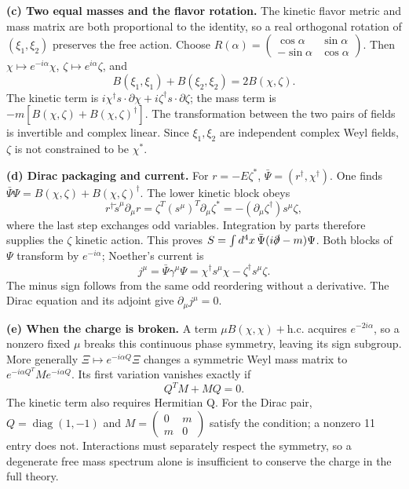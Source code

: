 \documentclass[11pt]{article}
\newcommand{\diag}{\operatorname{diag}}
\newcommand{\hc}{\mathrm{h.c.}}
\newcommand{\partsol}[2]{\par\Needspace{4\baselineskip}\medskip\noindent\textbf{(#1) #2.}\quad}
\begin{document}
\partsol{c}{Two equal masses and the flavor rotation}
The kinetic flavor metric and mass matrix are both proportional to the
identity, so a real orthogonal rotation of \((\xi_1,\xi_2)\) preserves
the free action. Choose
\(R(\alpha)=\left(\begin{smallmatrix}\cos\alpha&\sin\alpha\\
-\sin\alpha&\cos\alpha\end{smallmatrix}\right)\).
Then \(\chi\mapsto e^{-i\alpha}\chi\),
\(\zeta\mapsto e^{i\alpha}\zeta\), and
\[
 B(\xi_1,\xi_1)+B(\xi_2,\xi_2)=2B(\chi,\zeta).
\]
The kinetic term is \(i\chi^\dagger s\cdot\partial\chi+
 i\zeta^\dagger s\cdot\partial\zeta\); the mass term is
\(-m[B(\chi,\zeta)+B(\chi,\zeta)^\dagger]\).
The transformation between the two pairs of fields is invertible and
complex linear. Since \(\xi_1,\xi_2\) are independent complex Weyl fields,
\(\zeta\) is not constrained to be \(\chi^*\).

\partsol{d}{Dirac packaging and current}
For \(r=-E\zeta^*\), \(\bar\Psi=(r^\dagger,\chi^\dagger)\).
One finds \(\bar\Psi\Psi=B(\chi,\zeta)+B(\chi,\zeta)^\dagger\).
The lower kinetic block obeys
\[
 r^\dagger\widetilde s^\mu\partial_\mu r
 =\zeta^T(s^\mu)^T\partial_\mu\zeta^*
 =-(\partial_\mu\zeta^\dagger)s^\mu\zeta,
\]
where the last step exchanges odd variables. Integration by parts
therefore supplies the \(\zeta\) kinetic action. This proves
\(S=\int d^4x\,\bar\Psi(i\slashed\partial-m)\Psi\).
Both blocks of \(\Psi\) transform by \(e^{-i\alpha}\); Noether's current is
\[
 j^\mu=\bar\Psi\gamma^\mu\Psi
       =\chi^\dagger s^\mu\chi-\zeta^\dagger s^\mu\zeta.
\]
The minus sign follows from the same odd reordering without a derivative.
The Dirac equation and its adjoint give \(\partial_\mu j^\mu=0\).

\partsol{e}{When the charge is broken}
A term \(\mu B(\chi,\chi)+\hc\) acquires \(e^{-2i\alpha}\), so a
nonzero fixed \(\mu\) breaks this continuous phase symmetry, leaving
its sign subgroup. More generally \(\Xi\mapsto e^{-i\alpha Q}\Xi\)
changes a symmetric Weyl mass matrix to
\(e^{-i\alpha Q^T}Me^{-i\alpha Q}\). Its first variation vanishes exactly if
\[
 Q^TM+MQ=0.
\]
The kinetic term also requires Hermitian Q. For the Dirac pair,
\(Q=\diag(1,-1)\) and \(M=\left(\begin{smallmatrix}0&m\\m&0\end{smallmatrix}\right)\)
satisfy the condition; a nonzero 11 entry does not. Interactions must
separately respect the symmetry, so a degenerate free mass spectrum
alone is insufficient to conserve the charge in the full theory.
\end{document}
